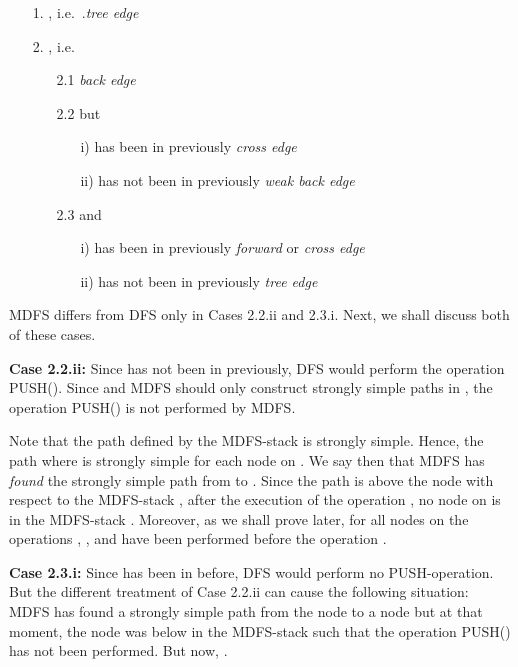 \documentclass[12pt,twoside,a4paper]{article}
\begin{document}
\begin{itemize}
\item[1.] , i.e.\ .\hfill {\em tree edge}
\item[2.] , i.e.\ 
      \vspace{-0.2cm}  
      \begin{itemize}
        \item[2.1]  \hfill {\em back edge}
        \item[2.2]  but 
                \begin{itemize}
                \item[i)]  has been in  previously \hfill {\em cross edge}
                \item[ii)]  has not been in  previously \hfill {\em weak back edge}
                \end{itemize} 
        \item[2.3]  and 
                \begin{itemize}
                \item[i)]  has been in  previously \hfill {\em
forward} or {\em cross edge}
                \item[ii)]  has not been in  previously \hfill {\em tree edge}
                \end{itemize}
        \end{itemize}
\end{itemize}
MDFS differs from DFS only in Cases 2.2.ii and 2.3.i. Next, we shall discuss
both of these cases.

\medskip
\noindent
{\bf Case 2.2.ii:} Since  has not been in  previously, DFS would 
perform the operation PUSH(). Since  and
MDFS should only construct strongly simple paths in , the operation PUSH() is 
not performed by MDFS.

Note that the path  defined by the MDFS-stack  is strongly
simple. Hence, the path  where  
is strongly simple for each node  on . We say then that MDFS has {\em found\/}
the strongly simple path  from  to .
Since the path  is above the node  with respect to the MDFS-stack , 
after the execution of the operation ,
no node on  is in the MDFS-stack . Moreover, as we shall prove later, for all nodes 
 on  the operations , , 
and  have been performed before the operation .

\medskip
\noindent
{\bf Case 2.3.i:} Since  has been in  before, DFS would perform no 
PUSH-operation. But the different treatment of Case 2.2.ii can cause the
following situation: 
MDFS has found a strongly simple path  from the node 
to a node  but at that moment, the node  was below  in the MDFS-stack
 such that the operation PUSH() has not been performed. But now, 
.
\end{document}

